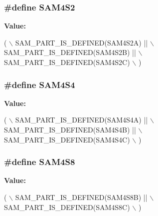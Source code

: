 \subsubsection[{S\+A\+M4\+S2}]{\setlength{\rightskip}{0pt plus 5cm}\#define S\+A\+M4\+S2}\label{group__sam__part__macros__group_ga797a42a5eb0d374075a5cbf6b6b5318b}
{\bfseries Value\+:}
\begin{DoxyCode}
( \(\backslash\)
        SAM\_PART\_IS\_DEFINED(SAM4S2A) || \(\backslash\)
        SAM\_PART\_IS\_DEFINED(SAM4S2B) || \(\backslash\)
        SAM\_PART\_IS\_DEFINED(SAM4S2C) \(\backslash\)
        )
\end{DoxyCode}
\hypertarget{group__sam__part__macros__group_ga9c0feae652dc37c207bd933f6db2d7f4}{}
\subsubsection[{S\+A\+M4\+S4}]{\setlength{\rightskip}{0pt plus 5cm}\#define S\+A\+M4\+S4}\label{group__sam__part__macros__group_ga9c0feae652dc37c207bd933f6db2d7f4}
{\bfseries Value\+:}
\begin{DoxyCode}
( \(\backslash\)
        SAM\_PART\_IS\_DEFINED(SAM4S4A) || \(\backslash\)
        SAM\_PART\_IS\_DEFINED(SAM4S4B) || \(\backslash\)
        SAM\_PART\_IS\_DEFINED(SAM4S4C) \(\backslash\)
        )
\end{DoxyCode}
\hypertarget{group__sam__part__macros__group_ga04e32c037894a537ffb6193413693cb0}{}
\subsubsection[{S\+A\+M4\+S8}]{\setlength{\rightskip}{0pt plus 5cm}\#define S\+A\+M4\+S8}\label{group__sam__part__macros__group_ga04e32c037894a537ffb6193413693cb0}
{\bfseries Value\+:}
\begin{DoxyCode}
( \(\backslash\)
        SAM\_PART\_IS\_DEFINED(SAM4S8B) || \(\backslash\)
        SAM\_PART\_IS\_DEFINED(SAM4S8C) \(\backslash\)
        )
\end{DoxyCode}
\hypertarget{group__sam__part__macros__group_ga51a0ff030b5d9e555653a4227538a888}{}
